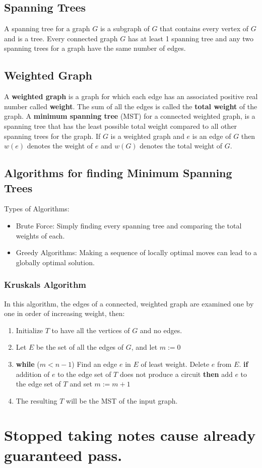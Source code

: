 \documentclass[a4paper]{article}
\begin{document}
  \subsection{Spanning Trees}
  A spanning tree for a graph $G$ is a subgraph of $G$ that contains every vertex of $G$ and is a tree. Every connected graph $G$ has at least 1 spanning tree and any two spanning trees for a graph have the same number of edges.
  \subsection{Weighted Graph}
  A \textbf{weighted graph} is a graph for which each edge has an associated positive real number called \textbf{weight}. The sum of all the edges is called the \textbf{total weight} of the graph. A \textbf{minimum spanning tree} (MST) for a connected weighted graph, is a spanning tree that has the least possible total weight compared to all other spanning trees for the graph. If $G$ is a weighted graph and $e$ is an edge of $G$ then $w(e)$ denotes the weight of $e$ and $w(G)$ denotes the total weight of $G$.
  \subsection{Algorithms for finding Minimum Spanning Trees}
  Types of Algorithms:
  \begin{itemize}
    \item Brute Force: Simply finding every spanning tree and comparing the total weights of each.
    \item Greedy Algorithms: Making a sequence of locally optimal moves can lead  to a globally optimal solution.
  \end{itemize}
  \subsubsection{Kruskal\textquotesingle s Algorithm}
  In this algorithm, the edges of a connected, weighted graph are examined one by one in order of increasing weight, then:
  \begin{enumerate}
    \item Initialize $T$ to have all the vertices of $G$ and no edges.
    \item Let $E$ be the set of all the edges of $G$, and let $m := 0$ 
    \item \textbf{while} ($m < n-1$)
      \subitem Find an edge $e$ in $E$ of least weight.
      \subitem Delete $e$ from $E$.
      \subitem \textbf{if} addition of $e$ to the edge set of $T$ does not produce a circuit 
      \subitem \textbf{then} add $e$ to the edge set of $T$ and set $m:= m+1$
    \item The resulting $T$ will be the MST of the input graph.

  \end{enumerate}
  \section{Stopped taking notes cause already guaranteed pass.} 
\end{document}
